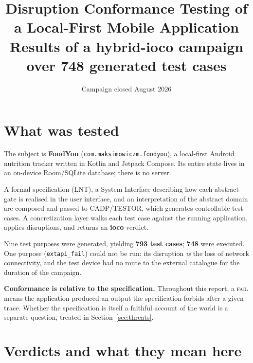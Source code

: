 \documentclass[11pt,a4paper]{article}
\title{\vspace{-1.5em}\textbf{Disruption Conformance Testing of a Local-First
Mobile Application}\\[0.3em]
\large Results of a hybrid-\textbf{ioco} campaign over 748 generated test cases}
\author{}
\date{Campaign closed August 2026}
\newcommand{\gate}[1]{\texttt{\small #1}}
\begin{document}
\maketitle
\vspace{-2.5em}

\section{What was tested}

The subject is \textbf{FoodYou} (\texttt{com.maksimowiczm.foodyou}), a
local-first Android nutrition tracker written in Kotlin and Jetpack Compose. Its
entire state lives in an on-device Room/SQLite database; there is no server.

A formal specification (LNT), a System Interface describing how each abstract
gate is realised in the user interface, and an interpretation of the abstract
domain are composed and passed to CADP/TESTOR, which generates controllable test
cases. A concretization layer walks each test case against the running
application, applies disruptions, and returns an \textbf{ioco} verdict.

Nine test purposes were generated, yielding \textbf{793 test cases}; \textbf{748}
were executed. One purpose (\gate{extapi\_fail}) could not be run: its
disruption \emph{is} the loss of network connectivity, and the test device had no
route to the external catalogue for the duration of the campaign.

\medskip
\noindent\textbf{Conformance is relative to the specification.} Throughout this
report, a \textsc{fail} means the application produced an output the
specification forbids after a given trace. Whether the specification is itself a
faithful account of the world is a separate question, treated in
Section~\ref{sec:threats}.

\section{Verdicts and what they mean here}
\end{document}
